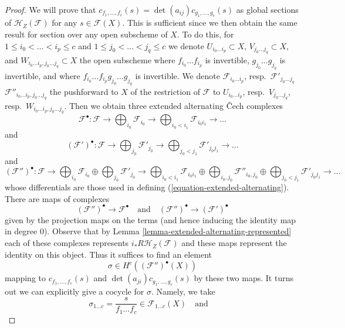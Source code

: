 \begin{proof}
We will prove that $c_{f_1, \ldots, f_c}(s) =
\det(a_{ij}) c_{g_1, \ldots, g_c}(s)$ as global sections of
$\mathcal{H}_Z(\mathcal{F})$ for any $s \in \mathcal{F}(X)$.
This is sufficient since we then obtain the same result for
section over any open subscheme of $X$.
To do this, for $1 \leq i_0 < \ldots < i_p \leq c$
and $1 \leq j_0 < \ldots < j_q \leq c$ we denote
$U_{i_0 \ldots i_p} \subset X$,
$V_{j_0 \ldots j_q} \subset X$, and
$W_{i_0 \ldots i_p, j_0 \ldots j_q} \subset X$
the open subscheme where $f_{i_0} \ldots f_{i_p}$ is invertible,
$g_{j_0} \ldots g_{j_q}$ is invertible, and where
$f_{i_0} \ldots f_{i_p}g_{j_0} \ldots g_{j_q}$ is invertible.
We denote $\mathcal{F}_{i_0 \ldots i_p}$,
resp.\ $\mathcal{F}'_{j_0 \ldots j_q}$
$\mathcal{F}''_{i_0 \ldots i_p, j_0 \ldots j_q}$
the pushforward to $X$ of the restriction of $\mathcal{F}$ to
$U_{i_0 \ldots i_p}$, resp.\ $V_{j_0 \ldots j_q}$,
resp.\ $W_{i_0 \ldots i_p, j_0 \ldots j_q}$.
Then we obtain three extended alternating {\v C}ech complexes
$$
\mathcal{F}^\bullet :
\mathcal{F} \to \bigoplus\nolimits_{i_0} \mathcal{F}_{i_0} \to
\bigoplus\nolimits_{i_0 < i_1} \mathcal{F}_{i_0i_1} \to \ldots
$$
and
$$
(\mathcal{F}')^\bullet :
\mathcal{F} \to \bigoplus\nolimits_{j_0} \mathcal{F}'_{j_0} \to
\bigoplus\nolimits_{j_0 < j_1} \mathcal{F}'_{j_0j_1} \to \ldots
$$
and
$$
(\mathcal{F}'')^\bullet :
\mathcal{F} \to
\bigoplus\nolimits_{i_0} \mathcal{F}_{i_0} \oplus
\bigoplus\nolimits_{j_0} \mathcal{F}'_{j_0} \to
\bigoplus\nolimits_{i_0 < i_1} \mathcal{F}_{i_0i_1} \oplus
\bigoplus\nolimits_{i_0, j_0} \mathcal{F}''_{i_0, j_0} \oplus
\bigoplus\nolimits_{j_0 < j_1} \mathcal{F}'_{j_0j_1} \to
\ldots
$$
whose differentials are those used in defining
(\ref{equation-extended-alternating}).
There are maps of complexes
$$
(\mathcal{F}'')^\bullet \to \mathcal{F}^\bullet
\quad\text{and}\quad
(\mathcal{F}'')^\bullet \to (\mathcal{F}')^\bullet
$$
given by the projection maps on the terms (and hence inducing
the identity map in degree $0$). Observe that by
Lemma \ref{lemma-extended-alternating-represented}
each of these complexes represents
$i_*R\mathcal{H}_Z(\mathcal{F})$ and these maps
represent the identity on this object. Thus it suffices
to find an element
$$
\sigma \in H^c((\mathcal{F}'')^\bullet(X))
$$
mapping to $c_{f_1, \ldots, f_c}(s)$ and $\det(a_{ji})c_{g_1, \ldots, g_c}(s)$
by these two maps. It turns out we can explicitly give a cocycle
for $\sigma$. Namely, we take
$$
\sigma_{1 \ldots c} = \frac{s}{f_1 \ldots f_c} \in \mathcal{F}_{1 \ldots c}(X)
\quad\text{and}\quad
$$
\end{proof}

